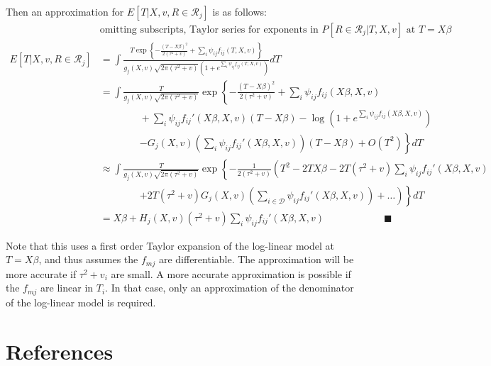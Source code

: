 \documentclass[
]{article}
\begin{document}
Then an approximation for \(E[T | X, v, R \in \mathcal{R}_j]\) is as follows:
\begin{align*}
  & \text{omitting subscripts, Taylor series for exponents in } P[R \in \mathcal{R}_j | T, X, v] \text{ at } T = X  \beta\\
E[T | X, v, R \in \mathcal{R}_j] 
  & = \int \frac{T \exp\left\{-\frac{(T - X\beta)^2}{2(\tau^2 + v)} + \sum_i \psi_{ij} f_{ij}(T, X, v)\right\}}{g_j(X, v)\sqrt{2 \pi (\tau^2 + v)} \left(1 + e^{\sum_i \psi_{ij} f_{ij}(T, X, v)}\right)} dT \\
  & = \int \frac{T}{g_j(X, v)\sqrt{2 \pi (\tau^2 + v)}} \exp\left\{-\frac{(T - X\beta)^2}{2(\tau^2 + v)} + \sum_i \psi_{ij} f_{ij} (X \beta, X, v) \right. \\
  & \qquad\qquad + \sum_i \psi_{ij} f_{ij}'(X \beta, X, v)(T - X \beta) - \log\left(1 + e^{\sum_i \psi_{ij} f_{ij} (X  \beta, X, v)}\right) \\
  & \qquad\qquad \left. - G_j(X, v)(\sum_i \psi_{ij} f_{ij}'(X  \beta, X, v))(T - X\beta) + O(T^2)\right\} dT \\
  & \approx \int \frac{T}{g_j(X, v)\sqrt{2 \pi (\tau^2 + v)}} \exp\left\{-\frac{1}{2(\tau^2 + v)}\left(T^2 - 2TX\beta - 2T (\tau^2 + v)\sum_{i} \psi_{ij} f_{ij}'(X \beta, X, v)\right.\right. \\
  & \qquad\qquad \left.\left.+ 2T(\tau^2 + v) G_j(X, v)(\sum_{i \in \mathcal{D}} \psi_{ij} f_{ij}'(X  \beta, X, v)) + \ldots\right)\right\} dT \\
  & = X\beta + H_j(X, v)(\tau^2 + v)\sum_{i} \psi_{ij} f_{ij}'(X  \beta, X, v)  \qquad\qquad\qquad \blacksquare
\end{align*}

Note that this uses a first order Taylor expansion of the log-linear model at \(T = X \beta\), and thus assumes the \(f_{mj}\) are differentiable.
The approximation will be more accurate if \(\tau^2 + v_i\) are small.
A more accurate approximation is possible if the \(f_{mj}\) are linear in \(T_i\).
In that case, only an approximation of the denominator of the log-linear model is required.

\clearpage

\hypertarget{references}{%
\section{References}\label{references}}

\setlength{\parindent}{-0.2in}
\setlength{\leftskip}{0.2in}
\setlength{\parskip}{8pt}
\end{document}
